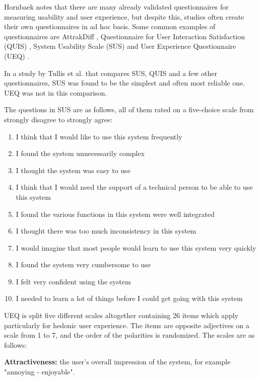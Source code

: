 Hornbaek \cite{hornbaek2006current} notes that there are many already validated questionnaires for measuring usability and user experience, but despite this, studies often create their own questionnaires in ad hoc basis. Some common examples of questionnaires are AttrakDiff \cite{hassenzahl2003attrakdiff}, Questionnaire for User Interaction Satisfaction (QUIS) \cite{chin1988questionnaire}, System Usability Scale (SUS) \cite{brooke1996sus} and User Experience Questionnaire (UEQ) \cite{laugwitz2008construction}.

In a study by Tullis et al. \cite{tullis2004comparison} that compares SUS, QUIS and a few other questionnaires, SUS was found to be the simplest and often most reliable one. UEQ was not in this comparison.

The questions in SUS are as follows, all of them rated on a five-choice scale from strongly disagree to strongly agree:

\begin{enumerate}
\item I think that I would like to use this system frequently
\item I found the system unnecessarily complex
\item I thought the system was easy to use                      
\item I think that I would need the support of a technical person to be able to use this system
\item I found the various functions in this system were well integrated
\item I thought there was too much inconsistency in this system
\item I would imagine that most people would learn to use this system very quickly
\item I found the system very cumbersome to use
\item I felt very confident using the system
\item I needed to learn a lot of things before I could get going with this system 
\end{enumerate}

UEQ is split five different scales altogether containing 26 items which apply particularly for hedonic user experience. The items are opposite adjectives on a scale from 1 to 7, and the order of the polarities is randomized. The scales are as follows:

\textbf{Attractiveness:} the user's overall impression of the system, for example "annoying - enjoyable".


